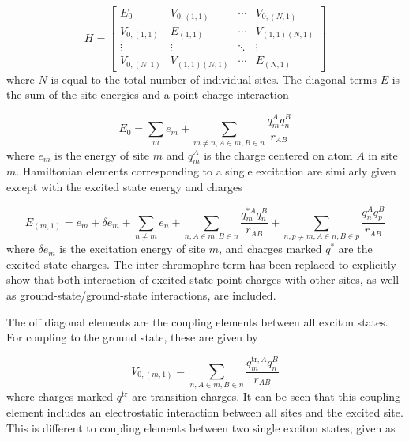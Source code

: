 \begin{equation}
    H = 
    \begin{bmatrix}
        E_0 & V_{0, \left(1, 1\right)} & \cdots & V_{0, \left(N, 1\right)} \\
        V_{0, \left(1, 1\right)} & E_{\left(1,1\right)} & \cdots & V_{\left(1,1\right) \left(N, 1\right)} \\
        \vdots & \vdots & \ddots & \vdots \\
        V_{0, \left(N, 1\right)} & V_{\left(1,1\right) \left(N, 1\right)} & \cdots & E_{\left(N, 1\right)}
    \end{bmatrix}
\end{equation}
%
where $N$ is equal to the total number of individual sites. The diagonal terms $E$
is the sum of the site energies and a point charge interaction

\begin{equation}
    E_0 = \sum_m e_m + \sum_{m \neq n, A \in m, B \in n} \frac{q^A_m q^B_n}{r_{AB}}
\end{equation}
%
where $e_m$ is the energy of site $m$ and $q^A_m$ is the charge centered on atom
$A$ in site $m$. Hamiltonian elements corresponding to a single excitation are similarly
given except with the excited state energy and charges

\begin{equation}
    E_{\left(m,1\right)} = e_m + \delta e_m + \sum_{n \neq m} e_n + \sum_{n, A \in m, B \in n} \frac{q^{\ast A}_m q^B_n}{r_{AB}} + \sum_{n,p \neq m, A \in n, B \in p} \frac{q^{A}_n q^B_p}{r_{AB}}
\end{equation}
%
where $\delta e_m$ is the excitation energy of site $m$, and charges marked $q^\ast$
are the excited state charges. The inter-chromophre term has been replaced to explicitly
show that both interaction of excited state point charges with other sites, as well
as ground-state/ground-state interactions, are included.

The off diagonal elements are the coupling elements between all exciton states.
For coupling to the ground state, these are given by

\begin{equation}
    V_{0, \left(m,1\right)} = \sum_{n, A \in m, B \in n} \frac{q^{\text{tr},A}_m q^B_n}{r_{AB}}
\end{equation}
%
where charges marked $q^{\text{tr}}$ are transition charges. It can be seen that 
this coupling element includes an electrostatic interaction between all sites and
the excited site. This is different to coupling elements between two single exciton
states, given as

